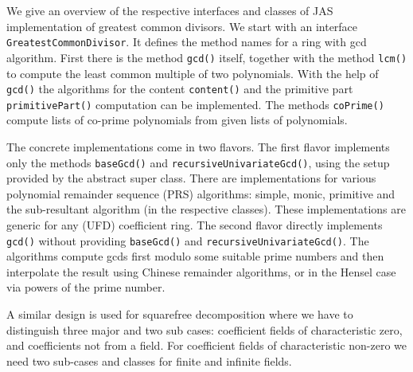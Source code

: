 \documentclass{llncs}
\newcommand{\code}[1]{\texttt{#1}}
\begin{document}
We give an overview of the respective interfaces and classes of JAS
implementation of greatest common divisors. We start with an
interface \code{Greatest\-Common\-Divisor}.  It defines the method
names for a ring with gcd algorithm.  First there is the method
\code{gcd()} itself, together with the method \code{lcm()} to compute
the least common multiple of two polynomials. With the help of
\code{gcd()} the algorithms for the content \code{con\-tent()} and the
primitive part \code{primitive\-Part()} computation can be
implemented.
%
The methods \code{coPrime()} compute lists of
co-prime polynomials from given lists of polynomials.


The concrete implementations come in two flavors.  The first flavor
implements only the methods \code{base\-Gcd()} and
\code{recursive\-Univariate\-Gcd()}, using the setup provided by the
abstract super class.  There are implementations for various
polynomial remainder sequence (PRS) algorithms: simple, monic,
primitive and the sub-resultant algorithm (in the respective classes).
These implementations are generic for any (UFD) coefficient ring.  The
second flavor directly implements \code{gcd()} without providing
\code{base\-Gcd()} and \code{recursive\-Univariate\-Gcd()}.  The
algorithms compute gcds first modulo some suitable prime numbers and
then interpolate the result using Chinese remainder algorithms, or in
the Hensel case via powers of the prime number.  

A similar design is used for squarefree decomposition where we have to
distinguish three major and two sub cases: coefficient fields of
characteristic zero, and coefficients not from a field. For
coefficient fields of characteristic non-zero we need two sub-cases
and classes for finite and infinite fields.
\end{document}
